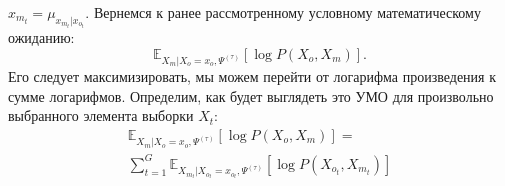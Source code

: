 \documentclass[11pt]{article}
\newcommand{\Expect}{\mathbb{E}}
\begin{document}
$\hat{x}_{m_t} = \mu_{x_{m_t}|x_{o_t}}$.
Вернемся к ранее рассмотренному условному математическому ожиданию:
\begin{equation*}
 \Expect_{X_m|X_o=x_o, \Psi^{(\tau)}}[\log P(X_o, X_m)].
\end{equation*}
Его следует максимизировать, мы можем перейти от логарифма произведения к сумме логарифмов. Определим, как будет выглядеть это УМО для произвольно выбранного элемента выборки $X_t$:
\begin{equation*}
\begin{gathered}
 \Expect_{X_m|X_o=x_o, \Psi^{(\tau)}}[\log P(X_o, X_m)] = \\
 \sum_{t=1}^G\Expect_{X_{m_t}|X_{o_t}=x_{o_t}, \Psi^{(\tau)}}[\log P(X_{o_t}, X_{m_t})]
\end{gathered}
\end{equation*}
\\
\\
\end{document}
